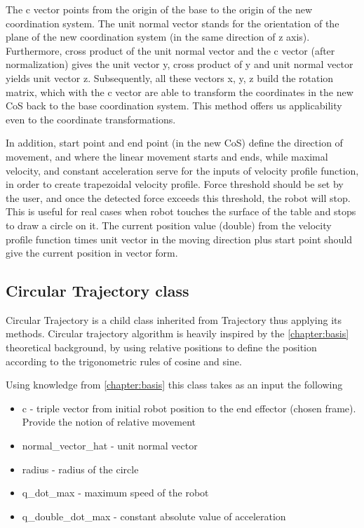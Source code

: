 The c vector points from the origin of the base to the origin of the new coordination system. The unit normal vector stands for the orientation of the plane of the new coordination system (in the same direction of z axis). Furthermore, cross product of the unit normal vector and the c vector (after normalization) gives the unit vector y, cross product of y and unit normal vector yields unit vector z. Subsequently, all these vectors x, y, z build the rotation matrix, which with the c vector are able to transform the coordinates in the new CoS back to the base coordination system. This method offers us applicability even to the coordinate transformations.

In addition, start point and end point (in the new CoS) define the direction of movement, and where the linear movement starts and ends, while maximal velocity, and constant acceleration serve for the inputs of velocity profile function, in order to create trapezoidal velocity profile. Force threshold should be set by the user, and once the detected force exceeds this threshold, the robot will stop. This is useful for real cases when robot touches the surface of the table and stops to draw a circle on it. The current position value (double) from the velocity profile function times unit vector in the moving direction plus start point should give the current position in vector form.

\subsection{Circular Trajectory class}

 Circular Trajectory is a child class inherited from Trajectory thus applying its methods. Circular trajectory algorithm is heavily inspired by the \ref{chapter:basis} theoretical background, by using relative positions to define the position according to the trigonometric rules of cosine and sine. 

Using knowledge from \ref{chapter:basis} this class takes as an input the following

\begin{itemize}
    \item c - triple vector from initial robot position to the end effector (chosen frame). Provide the notion of relative movement 
    \item normal\_vector\_hat - unit normal vector
    \item radius - radius of the circle
    \item q\_dot\_max - maximum speed of the robot
    \item q\_double\_dot\_max - constant absolute value of acceleration 
\end{itemize}

